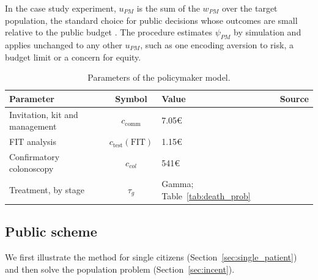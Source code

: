 \documentclass[12pt]{article}
\begin{document}
In the case study experiment, $u_{PM}$ is the sum of the $w_{PM}$ over the target population, the standard choice for public decisions whose outcomes are small relative to the public budget \citep{arrow1978uncertainty}. The procedure estimates $\psi_{PM}$ by simulation and applies unchanged to any other $u_{PM}$, such as one encoding aversion to risk, a budget limit or a concern for equity.

\begin{table}[h!]
\centering
\footnotesize
\caption{Parameters of the policymaker model.}
\label{tab:pm_params}
\begin{tabular}{l c l l}
\toprule
\textbf{Parameter} & \textbf{Symbol} & \textbf{Value} & \textbf{Source} \\
\midrule
Invitation, kit and management & $c_{\text{comm}}$ & 7.05€ & \citealp{arrospide2018cost} \\
FIT analysis & $c_{\text{test}}(\text{FIT})$ & 1.15€ & \citealp{arrospide2018cost} \\
Confirmatory colonoscopy & $c_{col}$ & 541€ & \citealp{arrospide2018cost, reumkens2016post} \\
Treatment, by stage & $\tau_g$ & Gamma; Table~\ref{tab:death_prob} & \citealp{corral2015estimation} \\
\bottomrule
\end{tabular}

\vspace{2pt}

\end{table}


 

\subsection{Public scheme}\label{sec:public_scheme_results}
We first illustrate the method for single citizens (Section~\ref{sec:single_patient}) and then solve the population problem (Section~\ref{sec:incent}).
\end{document}
